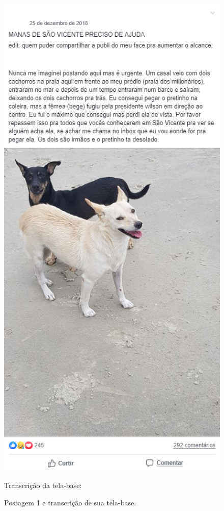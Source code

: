 \documentclass{textolivre}
\begin{document}
\begin{figure}[htbp]
 \begin{minipage}{.45\textwidth}
 \centering
 \includegraphics[width=\textwidth]{fig03.png}
 \caption{Postagem 1 e transcrição de sua tela-base.}
 \label{fig03}
 \end{minipage}\hfill
 \begin{minipage}{0.5\textwidth}
 Transcrição da tela-base:\\
 

\end{minipage}
\end{figure}
\end{document}
